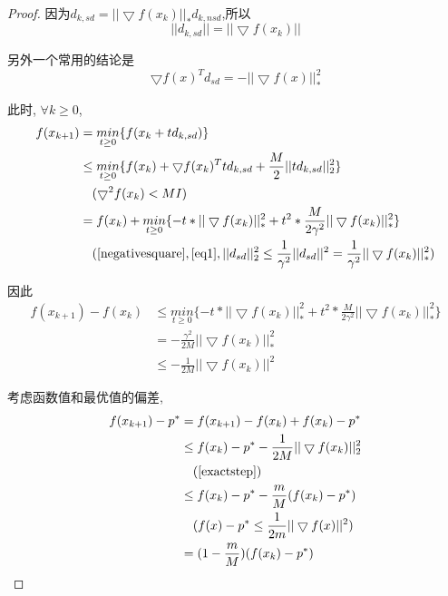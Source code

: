 \documentclass[UTF8]{ctexart}
\theoremstyle{Defination}
\theoremstyle{remark}
\begin{document}
\begin{proof}

因为$d_{k, sd}=||\bigtriangledown f(x_k)||_*d_{k, nsd}$,所以
\begin{equation}
\label{eq1}
||d_{k, sd}||=||\bigtriangledown f(x_k)||
\end{equation}

另外一个常用的结论是
\begin{equation}
\label{negativesquare}
\bigtriangledown f(x)^Td_{sd}=-||\bigtriangledown f(x)||_*^2
\end{equation}

此时, $\forall k\geq0$,
\begin{equation}
\begin{aligned}
f(x_{k+1}) & =\underset{t\geq0}{min}\{f(x_k+td_{k,sd})\} \\
 & \leq\underset{t\geq0}{min}\{f(x_k)+\bigtriangledown f(x_k)^Ttd_{k,sd}+\frac{M}{2}||td_{k,sd}||_2^2\} \\
 & \quad(\bigtriangledown^2f(x_k)<MI) \\
 & =f(x_k)+\underset{t\geq0}{min}\{-t*||\bigtriangledown f(x_k)||_*^2+t^2*\frac{M}{2\gamma^2}||\bigtriangledown f(x_k)||_*^2\} \\
 & \quad(\autoref{negativesquare}, \autoref{eq1}, ||d_{sd}||_2^2\leq\frac{1}{\gamma^2}||d_{sd}||^2=\frac{1}{\gamma^2}||\bigtriangledown f(x_k)||_*^2) \\
\end{aligned}
\end{equation}

因此
\begin{equation}
\begin{aligned}
\label{exactstep}
f(x_{k+1})-f(x_k) & \leq\underset{t\geq0}{min}\{-t*||\bigtriangledown f(x_k)||_*^2+t^2*\frac{M}{2\gamma^2}||\bigtriangledown f(x_k)||_*^2\} \\
 & =-\frac{\gamma^2}{2M}||\bigtriangledown f(x_k)||_*^2 \\
 & \leq -\frac{1}{2M}||\bigtriangledown f(x_k)||^2
\end{aligned}
\end{equation}

考虑函数值和最优值的偏差, 
\begin{equation}
\begin{aligned}
f(x_{k+1})-p^* & =f(x_{k+1})-f(x_k)+f(x_k)-p^* \\
 & \leq f(x_k)-p^*-\frac{1}{2M}||\bigtriangledown f(x_k)||_2^2 \\
 & \quad(\autoref{exactstep}) \\
 & \leq f(x_k)-p^*-\frac{m}{M}(f(x_k)-p^*) \\
 & \quad(f(x)-p^*\leq\frac{1}{2m}||\bigtriangledown f(x)||^2) \\
 & =(1-\frac{m}{M})(f(x_k)-p^*)
\end{aligned}
\end{equation}


\end{proof}
\end{document}
